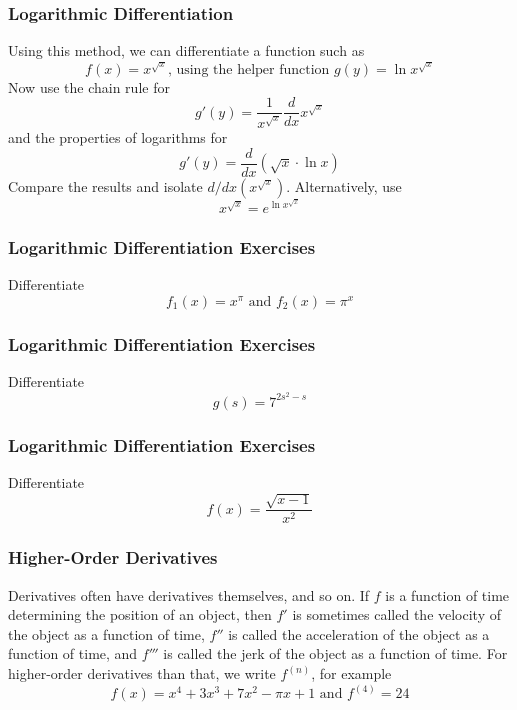 \documentclass[xcolor=dvipsnames]{beamer}
\begin{document}
\begin{frame}
  \frametitle{Logarithmic Differentiation}
Using this method, we can differentiate a function such as
\begin{equation}
  \label{eq:ooteiquo}
  f(x)=x^{\sqrt{x}}\mbox{, using the helper function }g(y)=\ln{}x^{\sqrt{x}}
\end{equation}
Now use the chain rule for
\begin{equation}
  \label{eq:quuquish}
  g'(y)=\frac{1}{x^{\sqrt{x}}}\frac{d}{dx}x^{\sqrt{x}}
\end{equation}
and the properties of logarithms for
\begin{equation}
  \label{eq:ahfahngi}
  g'(y)=\frac{d}{dx}\left(\sqrt{x}\cdot\ln{}x\right)
\end{equation}
Compare the results and isolate $d/dx(x^{\sqrt{x}})$. Alternatively,
use
\begin{equation}
  \label{eq:gaibahto}
  x^{\sqrt{x}}=e^{\ln{}x^{\sqrt{x}}}
\end{equation}
\end{frame}

\begin{frame}
  \frametitle{Logarithmic Differentiation Exercises}
  {\ubung} Differentiate
  \begin{equation}
    \label{eq:zofohsoi}
    f_{1}(x)=x^{\pi}\mbox{ and }f_{2}(x)=\pi^{x}
  \end{equation}
\end{frame}

\begin{frame}
  \frametitle{Logarithmic Differentiation Exercises}
  {\ubung} Differentiate
  \begin{equation}
    \label{eq:ietaemai}
    g(s)=7^{2s^{2}-s}
  \end{equation}
\end{frame}

\begin{frame}
  \frametitle{Logarithmic Differentiation Exercises}
  {\ubung} Differentiate
  \begin{equation}
    \label{eq:aishiili}
    f(x)=\frac{\sqrt{x-1}}{x^{2}}
  \end{equation}
\end{frame}

\begin{frame}
  \frametitle{Higher-Order Derivatives}
Derivatives often have derivatives themselves, and so on. If $f$ is a
function of time determining the position of an object, then $f'$ is
sometimes called the velocity of the object as a function of time,
$f''$ is called the acceleration of the object as a function of time,
and $f'''$ is called the jerk of the object as a function of time. For
higher-order derivatives than that, we write $f^{(n)}$, for example
\begin{equation}
  \label{eq:zeitohke}
  f(x)=x^{4}+3x^{3}+7x^{2}-\pi{}x+1\mbox{ and }f^{(4)}=24
\end{equation}
\end{frame}
\end{document}

